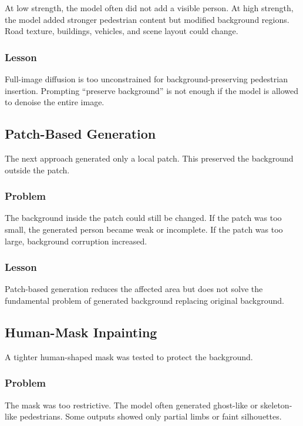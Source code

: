 \documentclass[12pt,a4paper]{article}
\begin{document}
At low strength, the model often did not add a visible person. At high strength,
the model added stronger pedestrian content but modified background regions.
Road texture, buildings, vehicles, and scene layout could change.

\subsubsection{Lesson}

Full-image diffusion is too unconstrained for background-preserving pedestrian
insertion. Prompting ``preserve background'' is not enough if the model is
allowed to denoise the entire image.

\subsection{Patch-Based Generation}

The next approach generated only a local patch. This preserved the background
outside the patch.

\subsubsection{Problem}

The background inside the patch could still be changed. If the patch was too
small, the generated person became weak or incomplete. If the patch was too
large, background corruption increased.

\subsubsection{Lesson}

Patch-based generation reduces the affected area but does not solve the
fundamental problem of generated background replacing original background.

\subsection{Human-Mask Inpainting}

A tighter human-shaped mask was tested to protect the background.

\subsubsection{Problem}

The mask was too restrictive. The model often generated ghost-like or
skeleton-like pedestrians. Some outputs showed only partial limbs or faint
silhouettes.
\end{document}
